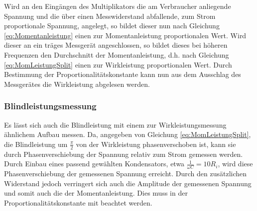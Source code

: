 Wird an den Eingängen des Multiplikators die am Verbraucher anliegende Spannung und die über einen Messwiderstand abfallende, zum Strom proportionale Spannung, angelegt, so bildet dieser nun nach Gleichung \eqref{eq:Momentanleistung} einen zur Momentanleistung proportionalen Wert. Wird dieser an ein träges Messgerät angeschlossen, so bildet dieses bei höheren Frequenzen den Durchschnitt der Momentanleistung, d.h. nach Gleichung \eqref{eq:MomLeistungSplit} einen zur Wirkleistung proportionalen Wert. Durch Bestimmung der Proportionalitätskonstante kann nun aus dem Ausschlag des Messgerätes die Wirkleistung abgelesen werden.

\subsubsection{Blindleistungsmessung}
\label{sec:MessungBlindleistung}
Es lässt sich auch die Blindleistung mit einem zur Wirkleistungsmessung ähnlichem Aufbau messen. Da, angegeben von Gleichung \eqref{eq:MomLeistungSplit}, die Blindleistung um $\frac{\pi}{2}$ von der Wirkleistung phasenverschoben ist, kann sie durch Phasenverschiebung der Spannung relativ zum Strom gemessen werden.
Durch Einbau eines passend gewählten Kondensators, etwa $\frac{1}{\omega C} = 10R_i$, wird diese Phasenverschiebung der gemessenen Spannung erreicht. Durch den zusätzlichen Widerstand jedoch verringert sich auch die Amplitude der gemessenen Spannung und somit auch die der Momentanleistung. Dies muss in der Proportionalitätskonstante mit beachtet werden.
